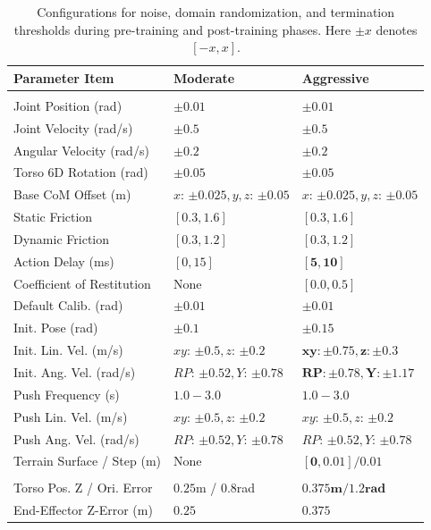 \begin{table}[t]
\centering
\scriptsize
\caption{\small Configurations for noise, domain randomization, and termination thresholds during pre-training and post-training phases. Here $\pm x$ denotes $[-x, x]$.}
\label{tab:randomization_params_standard_size}
\renewcommand{\arraystretch}{1.2} 
\begin{tabularx}{\columnwidth}{@{} >{\RaggedRight\arraybackslash}p{3.2cm} !{\hspace{-15pt}} l !{\hspace{-11pt}} X @{}}
\toprule
\textbf{Parameter Item} & \textbf{Moderate} & \textbf{Aggressive} \\ \midrule
{} \\
Joint Position (rad) & $\pm 0.01$ & $\pm 0.01$ \\
Joint Velocity (rad/s) & $\pm 0.5$ & $\pm 0.5$ \\
Angular Velocity (rad/s) & $\pm 0.2$ & $\pm 0.2$ \\
Torso 6D Rotation (rad) & $\pm 0.05$ & $\pm 0.05$ \\
Base CoM Offset (m) & $x$: $\pm 0.025, y,z$: $\pm 0.05$ & $x$: $\pm 0.025, y,z$: $\pm 0.05$ \\
Static Friction & $[0.3, 1.6]$ & $[0.3, 1.6]$ \\
Dynamic Friction & $[0.3, 1.2]$ & $[0.3, 1.2]$ \\
Action Delay (ms) & $[0, 15]$ & $\mathbf{[5, 10]}$ \\
Coefficient of Restitution & None & $\mathbf{[0.0, 0.5]}$ \\
Default Calib. (rad) & $\pm 0.01$ & $\pm 0.01$ \\
Init. Pose (rad) & $\pm 0.1$ & $\mathbf{\pm 0.15}$ \\
Init. Lin. Vel. (m/s) & $xy$: $\pm 0.5, z$: $\pm 0.2$ & $\mathbf{xy: \pm 0.75, z: \pm 0.3}$ \\
Init. Ang. Vel. (rad/s) & $RP$: $\pm 0.52, Y$: $\pm 0.78$ & $\mathbf{RP: \pm 0.78, Y: \pm 1.17}$ \\
Push Frequency (s) & $1.0 - 3.0$ & $1.0 - 3.0$ \\
Push Lin. Vel. (m/s) & $xy$: $\pm 0.5, z$: $\pm 0.2$ & $xy$: $\pm 0.5, z$: $\pm 0.2$ \\
Push Ang. Vel. (rad/s) & $RP$: $\pm 0.52, Y$: $\pm 0.78$ & $RP$: $\pm 0.52, Y$: $\pm 0.78$ \\
Terrain Surface / Step (m) & None & $\mathbf{[0, 0.01] / 0.01}$ \\ \midrule
{} \\
Torso Pos. Z / Ori. Error & $0.25$m / $0.8$rad & $\mathbf{0.375m / 1.2rad}$ \\
End-Effector Z-Error (m) & $0.25$ & $\mathbf{0.375}$ \\ \bottomrule
\end{tabularx}
\vspace{-17pt}
\end{table}